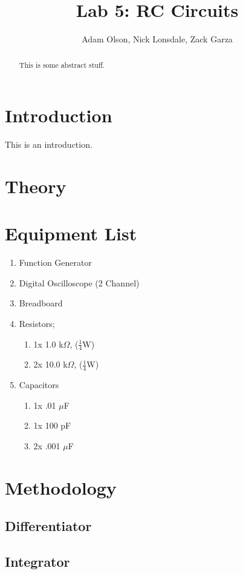 \documentclass[a4paper,10pt]{report}
\begin{document}
\title{Lab 5: RC Circuits}
\author{Adam Olson, Nick Lonsdale, Zack Garza}
\maketitle
\tableofcontents

\begin{abstract}
	This is some abstract stuff.
\end{abstract}

\chapter{Introduction}
This is an introduction.

\chapter{Theory}

\chapter{Equipment List}
	\begin{enumerate}
		\item Function Generator
		\item Digital Oscilloscope (2 Channel)
		\item Breadboard
		\item Resistors;
			\begin{enumerate}
				\item 1x 1.0 k$\Omega$, ($\frac{1}{4}$W)
				\item 2x 10.0 k$\Omega$, ($\frac{1}{4}$W)
			\end{enumerate}
		\item Capacitors
			\begin{enumerate}
				\item 1x .01 $\mu$F
				\item 1x 100 pF
				\item 2x .001 $\mu$F
			\end{enumerate}
	\end{enumerate}

\chapter{Methodology}
	\section{Differentiator}
	\section{Integrator}
\end{document}
